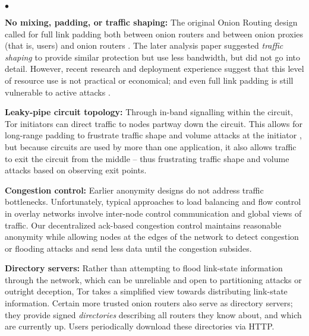 \documentclass[times,10pt,twocolumn]{article}
\newenvironment{tightlist}{\begin{list}{$\bullet$}{
  \setlength{\itemsep}{0mm}
    \setlength{\parsep}{0mm}
    }}{\end{list}}
\begin{document}
\begin{tightlist}
\item \textbf{No mixing, padding, or traffic shaping:} 
The original Onion Routing
design called for full link padding both between onion routers and between
onion proxies (that is, users) and onion routers \cite{or-jsac98}. The
later analysis paper \cite{or-pet00} suggested \emph{traffic shaping}
to provide similar protection but use less bandwidth, but did not go
into detail.  However, recent research \cite{econymics} and deployment
experience \cite{freedom21-security} suggest that this level of resource
use is not practical or economical; and even full link padding is still
vulnerable to active attacks \cite{defensive-dropping}.


\item \textbf{Leaky-pipe circuit topology:} Through in-band
  signalling within the
  circuit, Tor initiators can direct traffic to nodes partway down the
  circuit. This allows for long-range padding to frustrate traffic
  shape and volume attacks at the initiator \cite{defensive-dropping},
  but because circuits are used by more than one application, it also
  allows traffic to exit the circuit from the middle -- thus
  frustrating traffic shape and volume attacks based on observing exit
  points.

\item \textbf{Congestion control:} Earlier anonymity designs do not
address traffic bottlenecks. Unfortunately, typical approaches to load
balancing and flow control in overlay networks involve inter-node control
communication and global views of traffic. Our decentralized ack-based
congestion control maintains reasonable anonymity while allowing nodes
at the edges of the network to detect congestion or flooding attacks
and send less data until the congestion subsides.

\item \textbf{Directory servers:} Rather than attempting to flood
link-state information through the network, which can be unreliable and
open to partitioning attacks or outright deception, Tor takes a simplified
view towards distributing link-state information. Certain more trusted
onion routers also serve as directory servers; they provide signed
\emph{directories} describing all routers they know about, and which
are currently up. Users periodically download these directories via HTTP.


\end{tightlist}
\end{document}
